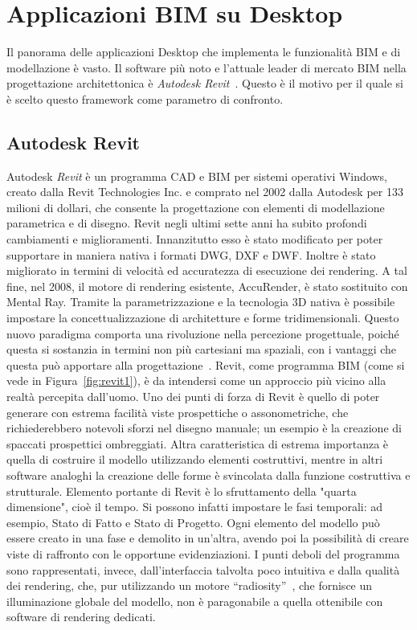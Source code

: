 \section{Applicazioni BIM su Desktop}
\label{sec:chapter_1_section_2}
Il panorama delle applicazioni Desktop che implementa le funzionalità BIM e di modellazione è vasto.
Il software più noto e l’attuale leader di mercato BIM nella
progettazione architettonica è
\emph{Autodesk Revit}~\cite{revit}.
Questo è il motivo per il quale si è scelto questo framework come parametro di confronto.

\subsection*{Autodesk Revit}
\label{sec:chapter_1_section_2_sub_1}
Autodesk \emph{Revit} è un programma CAD e BIM per sistemi operativi Windows, creato dalla Revit Technologies Inc. e comprato
nel 2002 dalla Autodesk per 133 milioni di dollari, che consente la progettazione con elementi di modellazione parametrica
e di disegno.
Revit negli ultimi sette anni ha subito profondi cambiamenti e miglioramenti. Innanzitutto esso è stato modificato per poter
supportare in maniera nativa i formati DWG, DXF e DWF. Inoltre è stato migliorato in termini di velocità ed accuratezza di
esecuzione dei rendering. A tal fine, nel 2008, il motore di rendering esistente, AccuRender, è stato sostituito con Mental Ray.
Tramite la parametrizzazione e la tecnologia 3D nativa è possibile impostare la concettualizzazione di architetture e forme
tridimensionali. Questo nuovo paradigma comporta una rivoluzione nella percezione progettuale, poiché questa si sostanzia in
termini non più cartesiani ma spaziali, con i vantaggi che questa può apportare alla progettazione~\cite{BIMrevolution}.
Revit, come programma BIM (come si vede in Figura~\ref{fig:revit1}), è da intendersi come un approccio più vicino alla realtà
percepita dall'uomo.
Uno dei punti di forza di Revit è quello di poter generare con estrema facilità viste prospettiche o assonometriche, che
richiederebbero notevoli sforzi nel disegno manuale; un esempio è la creazione di spaccati prospettici ombreggiati.
Altra caratteristica di estrema importanza è quella di costruire il modello utilizzando elementi costruttivi, mentre
in altri software analoghi la creazione delle forme è svincolata dalla funzione costruttiva e strutturale.
Elemento portante di Revit è lo sfruttamento della "quarta dimensione", cioè il tempo. Si possono infatti impostare le fasi
temporali: ad esempio, Stato di Fatto e Stato di Progetto. Ogni elemento del modello può essere creato in una fase e demolito
in un'altra, avendo poi la possibilità di creare viste di raffronto con le opportune evidenziazioni.
I punti deboli del programma sono rappresentati, invece, dall'interfaccia talvolta poco intuitiva e dalla qualità dei rendering,
che, pur utilizzando un motore ``radiosity''~\cite{radiosity}, che fornisce un illuminazione globale del modello, non è paragonabile
a quella ottenibile con software di rendering dedicati.\\

